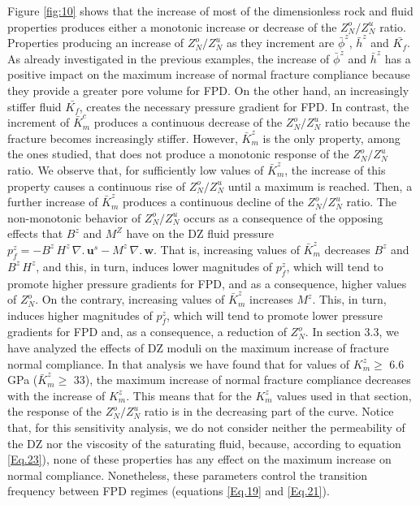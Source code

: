 \documentclass[draft]{agujournal2019}
\begin{document}
Figure \ref{fig:10} shows that the increase of most of the dimensionless rock and fluid properties produces either a monotonic increase or decrease of the $Z_N^o/Z_N^u$ ratio. Properties producing an increase of $Z_N^o/Z_N^u$ as they increment are $\bar{\phi}^z$, $\bar{h}^z$ and $\bar{K_f}$. As already investigated in the previous examples, the increase of $\bar{\phi}^z$ and $\bar{h}^z$ has a positive impact on the maximum increase of normal fracture compliance because they provide a greater pore volume for FPD. On the other hand, an increasingly stiffer fluid $\bar{K_f}$, creates the necessary pressure gradient for FPD.
In contrast, the increment of $\bar{K}_m^c$ produces a continuous decrease of the $Z_N^o/Z_N^u$ ratio because the fracture becomes increasingly stiffer. However,  $\bar{K}_m^z$  is the only property, among the ones studied, that does not produce a monotonic response of the  $Z_N^o/Z_N^u$ ratio. We observe that, for sufficiently low values of $\bar{K}_m^z$, the increase of this property causes a continuous rise of  $Z_N^o/Z_N^u$ until a maximum  is reached. Then, a further increase of $\bar{K}_m^z$ produces a continuous decline of the $Z_N^o/Z_N^u$ ratio. 
The non-monotonic behavior of  $Z_N^o/Z_N^u$ occurs as a consequence of the opposing effects that $B^z$ and $M^Z$ have on the DZ fluid pressure $p_f^z=- B^z \, H^z \, \nabla . \, \bm{u}^s - M ^z\, \nabla . \, \bm{w}$. That is, increasing values of $\bar{K}_m^z$ decreases $B^z$ and $B^z \, H^z$, and this, in turn, induces lower magnitudes of $p_f^z$,  which  will tend to promote higher pressure gradients for FPD, and as a consequence,  higher values of $Z_N^o$. On the contrary, increasing values of $\bar{K}_m^z$ increases $M^z$. This, in turn, induces higher magnitudes of $p_f^z$, which will tend to promote lower pressure gradients for FPD and, as a consequence, a reduction of $Z_N^o$.  
In section 3.3, we have  analyzed the effects of DZ moduli on the maximum increase of fracture normal compliance.
In that analysis we have found that for values of  $K_m^z \geq$ 6.6 GPa ($\bar{K}_m^z \geq$ 33), the maximum increase of normal fracture compliance decreases with the increase of  $K_m^z$. This  means that for the $K_m^z$  values used in that section, the response of the $Z_N^o/Z_N^u$  ratio is in the decreasing part of the curve.
Notice that, for this sensitivity analysis, we do not consider neither the permeability of the DZ nor the viscosity of the saturating fluid, because, according to equation \eqref{Eq.23}), none of these properties has any effect on the maximum increase on normal compliance. Nonetheless, these parameters control the transition frequency between FPD regimes (equations \eqref{Eq.19} and \eqref{Eq.21}).
\end{document}
